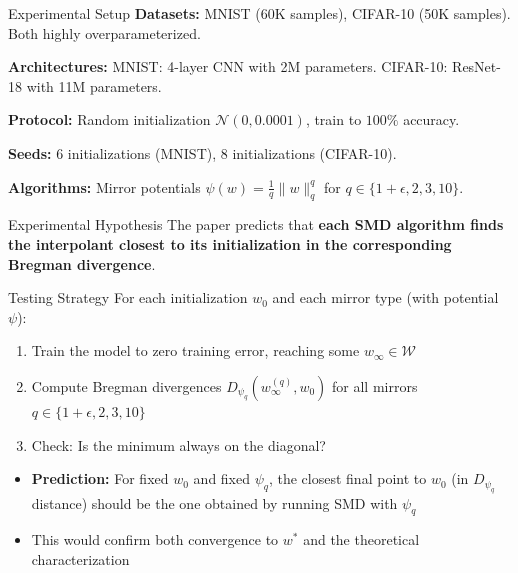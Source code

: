\documentclass[aspectratio=169]{beamer}
\begin{document}
\begin{frame}{Experimental Setup}
    \vspace{-0.2cm}
    \textbf{Datasets:} MNIST (60K samples), CIFAR-10 (50K samples). Both highly overparameterized.
    
    \vspace{0.08cm}
    \textbf{Architectures:} MNIST: 4-layer CNN with 2M parameters. CIFAR-10: ResNet-18 with 11M parameters.
    
    \vspace{0.08cm}
    \textbf{Protocol:} Random initialization $\mathcal{N}(0, 0.0001)$, train to $100\%$ accuracy.
    
    \vspace{0.08cm}
    \textbf{Seeds:} 6 initializations (MNIST), 8 initializations (CIFAR-10).
    
    \vspace{0.08cm}
    \textbf{Algorithms:} Mirror potentials $\psi(w) = \frac{1}{q}\|w\|_q^q$ for $q \in \{1+\epsilon, 2, 3, 10\}$.
\end{frame}

\begin{frame}{Experimental Hypothesis}
    The paper predicts that \textbf{each SMD algorithm finds the interpolant closest to its initialization in the corresponding Bregman divergence}.
    
    \begin{block}{Testing Strategy}
        For each initialization $w_0$ and each mirror type (with potential $\psi$):
        \begin{enumerate}
            \item Train the model to zero training error, reaching some $w_\infty \in \mathcal{W}$
            \item Compute Bregman divergences $D_{\psi_q}(w_\infty^{(q)}, w_0)$ for all mirrors $q \in \{1+\epsilon, 2, 3, 10\}$
            \item Check: Is the minimum always on the diagonal?
        \end{enumerate}
    \end{block}
    
    \begin{itemize}
        \item \textbf{Prediction:} For fixed $w_0$ and fixed $\psi_q$, the closest final point to $w_0$ (in $D_{\psi_q}$ distance) should be the one obtained by running SMD with $\psi_q$
        \item This would confirm both convergence to $w^*$ and the theoretical characterization
    \end{itemize}
\end{frame}
\end{document}
